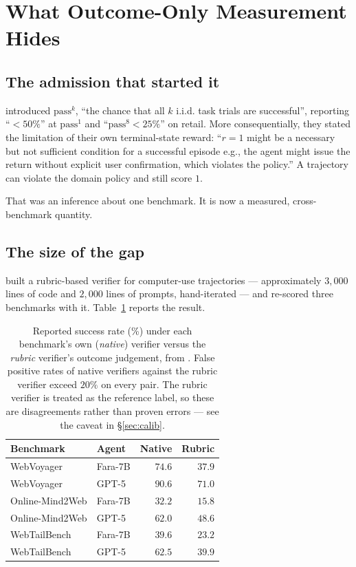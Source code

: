 \documentclass[10pt,twocolumn,a4paper]{article}
\begin{document}
\section{What Outcome-Only Measurement Hides}
\label{sec:outcome}

\subsection{The admission that started it}

\citet{yao2024taubenchbenchmarktoolagentuserinteraction} introduced $\mathrm{pass}^k$, ``the
chance that all $k$ i.i.d. task trials are successful'', reporting ``$<50\%$'' at
$\mathrm{pass}^1$ and ``$\mathrm{pass}^8 < 25\%$'' on retail.
More consequentially, they stated the limitation of their own terminal-state reward:
``$r = 1$ might be a necessary but not sufficient condition for a successful episode e.g.,
the agent might issue the return without explicit user confirmation, which violates the
policy.''
A trajectory can violate the domain policy and still score $1$.

That was an inference about one benchmark.
It is now a measured, cross-benchmark quantity.

\subsection{The size of the gap}

\citet{rosset2026artbuildingverifierscomputer} built a rubric-based verifier for
computer-use trajectories --- approximately $3{,}000$ lines of code and $2{,}000$ lines of
prompts, hand-iterated --- and re-scored three benchmarks with it.
Table~\ref{tab:gap} reports the result.

\begin{table}[t]
\centering
\begin{tabular}{@{}llrr@{}}
\toprule
Benchmark & Agent & Native & Rubric \\
\midrule
WebVoyager        & Fara-7B & $74.6$ & $37.9$ \\
WebVoyager        & GPT-5   & $90.6$ & $71.0$ \\
Online-Mind2Web   & Fara-7B & $32.2$ & $15.8$ \\
Online-Mind2Web   & GPT-5   & $62.0$ & $48.6$ \\
WebTailBench      & Fara-7B & $39.6$ & $23.2$ \\
WebTailBench      & GPT-5   & $62.5$ & $39.9$ \\
\bottomrule
\end{tabular}
\caption{Reported success rate (\%) under each benchmark's own (\emph{native}) verifier
versus the \emph{rubric} verifier's outcome judgement, from
\citet{rosset2026artbuildingverifierscomputer}.
False positive rates of native verifiers against the rubric verifier exceed $20\%$ on
every pair.
The rubric verifier is treated as the reference label, so these are disagreements rather
than proven errors --- see the caveat in \S\ref{sec:calib}.}
\label{tab:gap}
\end{table}
\end{document}
